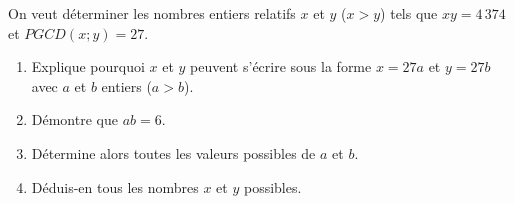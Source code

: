 
On veut déterminer les nombres entiers relatifs $x$ et $y$ ($x>y$)
tels que $xy=4\,374$ et $PGCD(x;y)=27$.
\begin{enumerate}
\item Explique pourquoi $x$ et $y$ peuvent s'écrire sous la forme
$x=27a$ et $y=27b$ avec $a$ et $b$ entiers ($a>b$).
\item Démontre que $ab=6$.
\item Détermine alors toutes les valeurs possibles de $a$ et $b$.
\item Déduis-en tous les nombres $x$ et $y$ possibles.
\end{enumerate}
